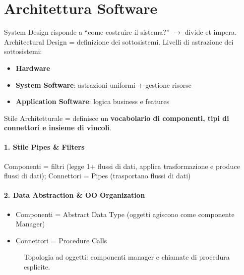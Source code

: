 \documentclass[12pt]{extarticle}
\begin{document}
\section{Architettura Software}
System Design risponde a ``come costruire il sistema?'' $\rightarrow$ divide et impera.\\
Architectural Design = definizione dei sottosistemi. Livelli di astrazione dei sottosistemi:
\begin{itemize}
    \item \textbf{Hardware}
    \item \textbf{System Software}: astrazioni uniformi + gestione risorse
    \item \textbf{Application Software}: logica business e features
\end{itemize}

\noindent Stile Architetturale = definisce un \textbf{vocabolario di componenti, tipi di connettori e insieme di vincoli}.

\paragraph{1. Stile Pipes \& Filters} Componenti = filtri (legge 1+ flussi di dati, applica trasformazione e produce flussi di dati); Connettori = Pipes (trasportano flussi di dati)

\paragraph{2. Data Abstraction \& OO Organization}
\begin{itemize}
    \item Componenti = Abstract Data Type (oggetti agiscono come componente Manager)
    \item Connettori = Procedure Calls
\end{itemize}

\begin{figure}[htbp]
\centering
{}
\caption{Topologia ad oggetti: componenti manager e chiamate di procedura esplicite.}
\label{fig:oo_organization_diagram}
\end{figure}
\end{document}
